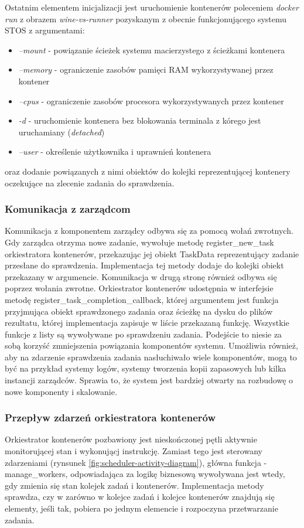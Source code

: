 Ostatnim elementem inicjalizacji jest uruchomienie kontenerów poleceniem \textit{docker run} z obrazem \textit{wine-vs-runner} pozyskanym z obecnie funkcjonującego systemu STOS z argumentami:
\begin{itemize}
    \item \textit{--mount} - powiązanie ścieżek systemu macierzystego z ścieżkami kontenera
    \item \textit{--memory} - ograniczenie zasobów pamięci RAM wykorzystywanej przez kontener
    \item \textit{--cpus} - ograniczenie zasobów procesora wykorzystywanych przez kontener
    \item \textit{-d} - uruchomienie kontenera bez blokowania terminala z kórego jest uruchamiany (\textit{detached})
    \item \textit{--user} - określenie użytkownika i uprawnień kontenera
\end{itemize}
oraz dodanie powiązanych z nimi obiektów do kolejki reprezentującej kontenery oczekujące na zlecenie zadania do sprawdzenia.

\subsubsection{Komunikacja z zarządcom}
Komunikacja z komponentem zarządcy odbywa się za pomocą wołań zwrotnych. Gdy zarządca otrzyma nowe zadanie, wywołuje metodę register\_new\_task orkiestratora kontenerów, przekazując jej obiekt TaskData reprezentujący zadanie przesłane do sprawdzenia. Implementacja tej metody dodaje do kolejki obiekt przekazany w argumencie. Komunikacja w drugą stronę również odbywa się poprzez wołania zwrotne. Orkiestrator kontenerów udostępnia w interfejsie metodę register\_task\_completion\_callback, której argumentem jest funkcja przyjmująca obiekt sprawdzonego zadania oraz ścieżkę na dysku do plików rezultatu, której implementacja zapisuje w liście przekazaną funkcję. Wszystkie funkcje z listy są wywoływane po sprawdzeniu zadania. Podejście to niesie za sobą korzyść zmniejszenia powiązania komponentów systemu. Umożliwia również, aby na zdarzenie sprawdzenia zadania nasłuchiwało wiele komponentów, mogą to być na przykład systemy logów, systemy tworzenia kopii zapasowych lub kilka instancji zarządców. Sprawia to, że system jest bardziej otwarty na rozbudowę o nowe komponenty i skalowanie.

\subsubsection{Przepływ zdarzeń orkiestratora kontenerów}
Orkiestrator kontenerów pozbawiony jest nieskończonej pętli aktywnie monitorującej stan i wykonującj instrukcję. Zamiast tego jest sterowany zdarzeniami (rynsunek \ref{fig:scheduler-activity-diagram}), główna funkcja - manage\_workers, odpowiadająca za logikę biznesową wywoływana jest wtedy, gdy zmienia się stan kolejek zadań i kontenerów. Implementacja metody sprawdza, czy w zarówno w kolejce zadań i kolejce kontenerów znajdują się elementy, jeśli tak, pobiera po jednym elemencie i rozpoczyna przetwarzanie zadania.

